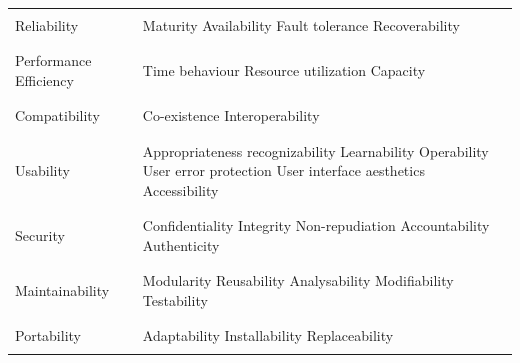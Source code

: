 \begin{longtable}{p{} | p{}}
    \hline
    \\
    Reliability &
    Maturity \newline
    Availability \newline
    Fault tolerance \newline
    Recoverability \\
    \\
    \hline
    \\
    Performance Efficiency &
    Time behaviour \newline
    Resource utilization \newline
    Capacity \\
    \\
    \hline
    \\
    Compatibility &
    Co-existence \newline
    Interoperability \\
    \\
    \hline
    \\
    Usability &
    Appropriateness recognizability \newline
    Learnability \newline
    Operability \newline
    User error protection \newline
    User interface aesthetics \newline
    Accessibility \\
    \\
    \hline
    \\
    Security &
    Confidentiality \newline
    Integrity \newline
    Non-repudiation \newline
    Accountability \newline
    Authenticity \\
    \\
    \hline
    \\
    Maintainability &
    Modularity \newline
    Reusability \newline
    Analysability \newline
    Modifiability \newline
    Testability \\
    \\
    \hline
    \\
    Portability &
    Adaptability \newline
    Installability \newline
    Replaceability \\
    \\
\end{longtable}



